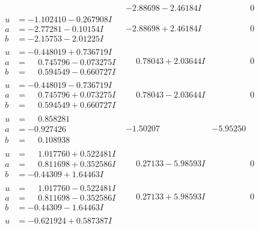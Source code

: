 \documentclass[1p]{elsarticle_modified}
\theoremstyle{definition}
\begin{document}
$$\begin{array}{c|c|c}
 & -2.88698 - 2.46184 I & \phantom{-0.000000 } 0 \\ \hline\begin{aligned}
u &= -1.102410 - 0.267908 I \\
a &= -2.77281 - 0.10154 I \\
b &= -2.15753 - 2.01225 I\end{aligned}
 & -2.88698 + 2.46184 I & \phantom{-0.000000 } 0 \\ \hline\begin{aligned}
u &= -0.448019 + 0.736719 I \\
a &= \phantom{-}0.745796 - 0.073275 I \\
b &= \phantom{-}0.594549 - 0.660727 I\end{aligned}
 & \phantom{-}0.78043 + 2.03644 I & \phantom{-0.000000 } 0 \\ \hline\begin{aligned}
u &= -0.448019 - 0.736719 I \\
a &= \phantom{-}0.745796 + 0.073275 I \\
b &= \phantom{-}0.594549 + 0.660727 I\end{aligned}
 & \phantom{-}0.78043 - 2.03644 I & \phantom{-0.000000 } 0 \\ \hline\begin{aligned}
u &= \phantom{-}0.858281\phantom{ +0.000000I} \\
a &= -0.927426\phantom{ +0.000000I} \\
b &= \phantom{-}0.108938\phantom{ +0.000000I}\end{aligned}
 & -1.50207\phantom{ +0.000000I} & -5.95250\phantom{ +0.000000I} \\ \hline\begin{aligned}
u &= \phantom{-}1.017760 + 0.522481 I \\
a &= \phantom{-}0.811698 + 0.352586 I \\
b &= -0.44309 + 1.64463 I\end{aligned}
 & \phantom{-}0.27133 - 5.98593 I & \phantom{-0.000000 } 0 \\ \hline\begin{aligned}
u &= \phantom{-}1.017760 - 0.522481 I \\
a &= \phantom{-}0.811698 - 0.352586 I \\
b &= -0.44309 - 1.64463 I\end{aligned}
 & \phantom{-}0.27133 + 5.98593 I & \phantom{-0.000000 } 0 \\ \hline\begin{aligned}
u &= -0.621924 + 0.587387 I \\

\end{aligned}
\end{array}$$
\end{document}
